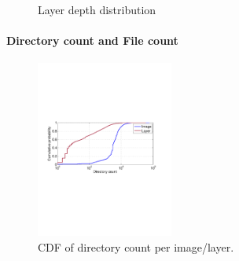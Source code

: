 \begin{figure}[!t]
	\centering
	\caption{Layer depth distribution}
	\label{fig:reference-cnt}
\end{figure}

\paragraph{Directory count and File count}
\begin{figure}
	\centering
	\includegraphics[width=0.4\textwidth]{graphs/dir-cnt-cdf.pdf}
	\caption{CDF of directory count per image/layer.
	}
	\label{fig:reference-cnt}
\end{figure}

